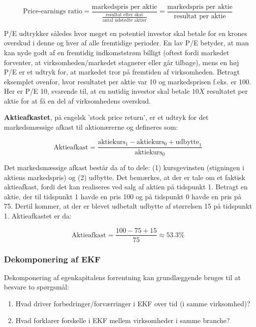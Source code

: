 \documentclass[10pt,reqno, usenames]{article}
\begin{document}
\begin{equation}
    \text{Price-earnings ratio} =  \frac{\text{markedspris per aktie}}{\frac{\text{resultat efter skat}}{\text{antal udstedte aktier}}} = \frac{\text{markedspris per aktie}}{\text{resultat per aktie}}
\end{equation}

P/E udtrykker således hvor meget en potentiel investor skal betale for en krones overskud i denne og hver af alle fremtidige perioder. En lav P/E betyder, at man kan nyde godt af en fremtidig indkomststrøm billigt (oftest fordi markedet forventer, at virksomheden/markedet stagnerer eller går tilbage), mens en høj P/E er et udtryk for, at markedet tror på fremtiden af virksomheden. Betragt eksemplet ovenfor, hvor resultatet per aktie var 10 og markedsprisen f.eks. er 100. Her er P/E 10, svarende til, at en nutidig investor skal betale $10X$ resultatet per aktie for at få en del af virksomhedens overskud. 

\vspace{10 pt}

\textbf{Aktieafkastet}, på engelsk 'stock price return', er et udtryk for det markedsmæssige afkast til aktionærerne og defineres som: 

\begin{equation}
    \text{Aktieafkast} = \frac{\text{aktiekurs}_1 - \text{aktiekurs}_0 + \text{udbytte}_1}{\text{aktiekurs}_0}
\end{equation}

Det markedsmæssige afkast består da af to dele: (1) kursgevinsten (stigningen i aktiens markedspris) og (2) udbytte. Det bemærkes, at der er tale om et faktisk aktieafkast, fordi det kan realiseres ved salg af aktien på tidspunkt 1. Betragt en aktie, der til tidspunkt 1 havde en pris 100 og på tidspunkt 0 havde en pris på 75. Dertil kommer, at der er blevet udbetalt udbytte af størrelsen 15 på tidspunkt 1. Aktieafkastet er da: 

\begin{equation}
    \text{Aktieafkast} = \frac{100-75+15}{\text{75}} \approx 53.3 \% \nonumber
\end{equation}


\subsubsection{Dekomponering af EKF}
Dekomponering af egenkapitalens forrentning kan grundlæggende bruges til at besvare to spørgsmål: 
\begin{enumerate}
    \item Hvad driver forbedringer/forværringer i EKF over tid (i samme virksomhed)?
    \item Hvad forklarer forskelle i EKF mellem virksomheder i samme branche?
\end{enumerate}
\end{document}
